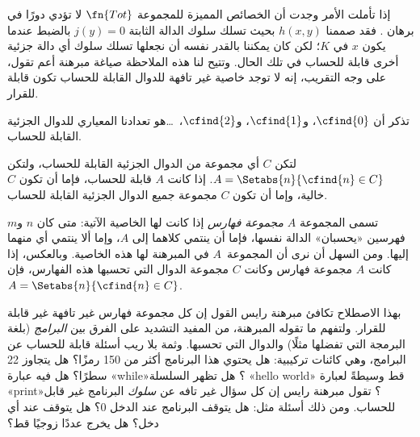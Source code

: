 \documentclass[../../../include/open-logic-section]{subfiles}
\begin{document}

إذا تأملت الأمر وجدت أن الخصائص المميزة للمجموعة $\fn{Tot}$ لا تؤدي
دورًا في برهان . فقد صممنا $h(x,y)$ بحيث تسلك
سلوك الدالة الثابتة $j(y)=0$ بالضبط عندما يكون $x$ في $K$؛ لكن كان
يمكننا بالقدر نفسه أن نجعلها تسلك سلوك أي دالة جزئية أخرى قابلة
للحساب في تلك الحال. وتتيح لنا هذه الملاحظة صياغة مبرهنة أعم تقول،
على وجه التقريب، إنه لا توجد خاصية غير تافهة للدوال القابلة للحساب
تكون قابلة للقرار.

تذكر أن $\cfind{0}$، و$\cfind{1}$، و$\cfind{2}$،~\dots هو تعدادنا
المعياري للدوال الجزئية القابلة للحساب.

\begin{thm}
  لتكن $C$ أي مجموعة من الدوال الجزئية القابلة للحساب، ولتكن $A =
  \Setabs{n}{\cfind{n} \in C}$. إذا كانت $A$ قابلة للحساب، فإما أن
  تكون $C$ خالية، وإما أن تكون $C$ مجموعة جميع الدوال الجزئية
  القابلة للحساب.
\end{thm}

تسمى المجموعة $A$ \emph{مجموعة فهارس} إذا كانت لها الخاصية الآتية:
متى كان $n$ و$m$ فهرسين «يحسبان» الدالة نفسها، فإما أن ينتمي كلاهما
إلى $A$، وإما ألا ينتمي أي منهما إليها. ومن السهل أن نرى أن
المجموعة~$A$ في المبرهنة لها هذه الخاصية. وبالعكس، إذا كانت $A$
مجموعة فهارس وكانت $C$ مجموعة الدوال التي تحسبها هذه الفهارس، فإن
$A = \Setabs{n}{\cfind{n} \in C}$.

\begin{explain}
بهذا الاصطلاح تكافئ مبرهنة رايس القول إن كل مجموعة فهارس غير تافهة
غير قابلة للقرار. ولتفهم ما تقوله المبرهنة، من المفيد التشديد على
الفرق بين \emph{البرامج} (بلغة البرمجة التي تفضلها مثلًا) والدوال
التي تحسبها. وثمة بلا ريب أسئلة قابلة للحساب عن البرامج، وهي كائنات
تركيبية: هل يحتوي هذا البرنامج أكثر من 150 رمزًا؟ هل يتجاوز 22
سطرًا؟ هل فيه عبارة «while»؟ هل تظهر السلسلة «hello world» قط وسيطةً
لعبارة «print»؟ تقول مبرهنة رايس إن كل سؤال غير تافه عن
\emph{سلوك} البرنامج غير قابل للحساب. ومن ذلك أسئلة مثل: هل يتوقف
البرنامج عند الدخل $0$؟ هل يتوقف عند أي دخل؟ هل يخرج عددًا زوجيًا
قط؟
\end{explain}
\end{document}
